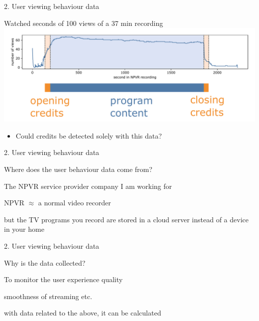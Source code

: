 \documentclass[first=orange,second=blue,logo=blueque]{aaltoslides}
\newcommand{\SubItem}[1]{
    {\setlength\itemindent{15pt} \item[$\bullet$] #1}
}
\begin{document}

\begin{frame}{2. User viewing behaviour data}
    \begin{block}{{\color{black}Watched seconds of 100 views of a 37 min recording}}
        \center
        \includegraphics[width=1\textwidth]{figures/data1.pdf}
        \begin{itemize}
            \item Could credits be detected solely with this data?
        \end{itemize}
    \end{block}
\end{frame}


\begin{frame}{2. User viewing behaviour data}
    \begin{block}{{\color{black}\alert{Where} does the user behaviour data come from?}}
        \begin{itemize}
            \item The NPVR service provider company I am working for
            \item NPVR $\approx$ a normal video recorder
                \SubItem{but the TV programs you record are stored in a cloud server instead of a device in your home}
        \end{itemize}
    \end{block}
\end{frame}


\begin{frame}{2. User viewing behaviour data}
    \begin{block}{{\color{black}\alert{Why} is the data collected?}}
        \begin{itemize}
            \item To monitor the user experience quality
                \SubItem{smoothness of streaming etc.}
                \SubItem{with data related to the above, 
                it can be calculated \color{orange}{which parts of a recording were watched during a view, and which parts were fast forwarded}}
        \end{itemize}
    \end{block}
\end{frame}
\end{document}
